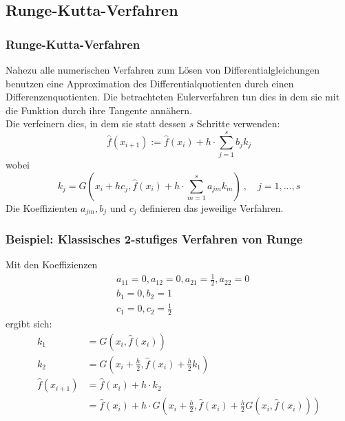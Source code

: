 \subsection{Runge-Kutta-Verfahren}
\begin{frame}\frametitle{Runge-Kutta-Verfahren}
Nahezu alle numerischen Verfahren zum Lösen von Differentialgleichungen benutzen eine Approximation des Differentialquotienten durch einen Differenzenquotienten. Die betrachteten Eulerverfahren tun dies in dem sie mit  die Funktion durch ihre Tangente annähern.\\ \pause
Die  verfeinern dies, in dem sie statt dessen $s$ Schritte verwenden:
$$
\hat f(x_{i+1}):=\hat f(x_i) + h\cdot \sum_{j=1}^s b_jk_j
$$
wobei
$$
k_j=G\left(x_i+hc_j, \hat f(x_i)+h \cdot \sum_{m=1}^{s} a_{jm}k_m \right)\ , \quad j=1,...,s 
$$
Die Koeffizienten $a_{jm}, b_j$ und $c_j$ definieren das jeweilige Verfahren.
\end{frame}
%
\begin{frame}\frametitle{Beispiel: Klassisches 2-stufiges Verfahren von Runge}
Mit den Koeffizienzen 
\begin{align*}
&a_{11}=0, a_{12}=0, a_{21}=\frac{1}{2}, a_{22}=0\\
&b_1=0, b_2=1\\
&c_1=0, c_2=\frac{1}{2}
\end{align*}
ergibt sich:\pause
\begin{align*}
k_1&=G(x_i, \hat f(x_i))\\
k_2&=G(x_i+\frac{h}{2}, \hat f(x_i)+ \frac{h}{2}k_1)\\
\hat f(x_{i+1})&=\hat f(x_i)+h\cdot k_2\\
&=\hat f(x_i)+h\cdot G\left(x_i+\frac{h}{2}, \hat f(x_i)+ \frac{h}{2}G(x_i, \hat f(x_i))\right)
\end{align*}
\end{frame}
%
